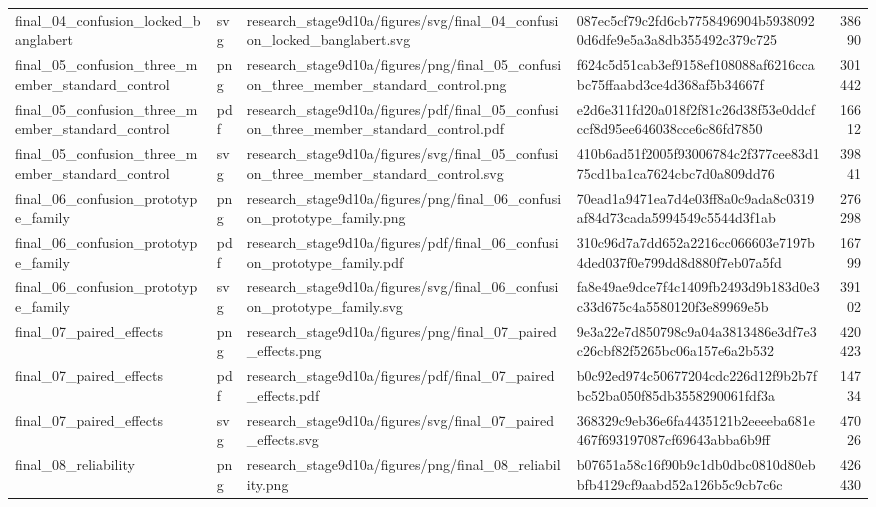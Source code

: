 \begin{tabular}{llllr}
final\_04\_confusion\_locked\_banglabert & svg & research\_stage9d10a/figures/svg/final\_04\_confusion\_locked\_banglabert.svg & 087ec5cf79c2fd6cb7758496904b59380920d6dfe9e5a3a8db355492c379c725 & 38690 \\
final\_05\_confusion\_three\_member\_standard\_control & png & research\_stage9d10a/figures/png/final\_05\_confusion\_three\_member\_standard\_control.png & f624c5d51cab3ef9158ef108088af6216ccabc75ffaabd3ce4d368af5b34667f & 301442 \\
final\_05\_confusion\_three\_member\_standard\_control & pdf & research\_stage9d10a/figures/pdf/final\_05\_confusion\_three\_member\_standard\_control.pdf & e2d6e311fd20a018f2f81c26d38f53e0ddcfccf8d95ee646038cce6c86fd7850 & 16612 \\
final\_05\_confusion\_three\_member\_standard\_control & svg & research\_stage9d10a/figures/svg/final\_05\_confusion\_three\_member\_standard\_control.svg & 410b6ad51f2005f93006784c2f377cee83d175cd1ba1ca7624cbc7d0a809dd76 & 39841 \\
final\_06\_confusion\_prototype\_family & png & research\_stage9d10a/figures/png/final\_06\_confusion\_prototype\_family.png & 70ead1a9471ea7d4e03ff8a0c9ada8c0319af84d73cada5994549c5544d3f1ab & 276298 \\
final\_06\_confusion\_prototype\_family & pdf & research\_stage9d10a/figures/pdf/final\_06\_confusion\_prototype\_family.pdf & 310c96d7a7dd652a2216cc066603e7197b4ded037f0e799dd8d880f7eb07a5fd & 16799 \\
final\_06\_confusion\_prototype\_family & svg & research\_stage9d10a/figures/svg/final\_06\_confusion\_prototype\_family.svg & fa8e49ae9dce7f4c1409fb2493d9b183d0e3c33d675c4a5580120f3e89969e5b & 39102 \\
final\_07\_paired\_effects & png & research\_stage9d10a/figures/png/final\_07\_paired\_effects.png & 9e3a22e7d850798c9a04a3813486e3df7e3c26cbf82f5265bc06a157e6a2b532 & 420423 \\
final\_07\_paired\_effects & pdf & research\_stage9d10a/figures/pdf/final\_07\_paired\_effects.pdf & b0c92ed974c50677204cdc226d12f9b2b7fbc52ba050f85db3558290061fdf3a & 14734 \\
final\_07\_paired\_effects & svg & research\_stage9d10a/figures/svg/final\_07\_paired\_effects.svg & 368329c9eb36e6fa4435121b2eeeeba681e467f693197087cf69643abba6b9ff & 47026 \\
final\_08\_reliability & png & research\_stage9d10a/figures/png/final\_08\_reliability.png & b07651a58c16f90b9c1db0dbc0810d80ebbfb4129cf9aabd52a126b5c9cb7c6c & 426430 \\

\end{tabular}
